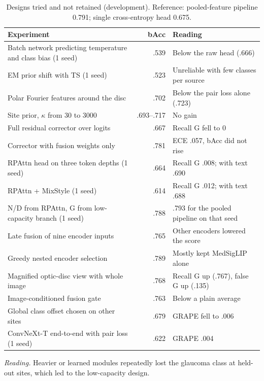 \documentclass[runningheads]{llncs}
\newcommand{\reading}[1]{\par\noindent\textit{Reading.} #1\par\medskip}
\begin{document}
\begin{table}[htbp]
\caption{Designs tried and not retained (development). Reference: pooled-feature pipeline 0.791; single cross-entropy head 0.675.}\label{tab:neg}\centering\scriptsize
\begin{tabular}{@{}p{}rp{}@{}}
\toprule
Experiment & bAcc & Reading\\
\midrule
Batch network predicting temperature and class bias (1 seed) & .539 & Below the raw head (.666)\\
EM prior shift with TS (1 seed) & .523 & Unreliable with few classes per source\\
Polar Fourier features around the disc & .702 & Below the pair loss alone (.723)\\
Site prior, $\kappa$ from 30 to 3000 & .693--.717 & No gain\\
Full residual corrector over logits & .667 & Recall G fell to 0\\
Corrector with fusion weights only & .781 & ECE .057, bAcc did not rise\\
RPAttn head on three token depths (1 seed) & .664 & Recall G .008; with text .690\\
RPAttn + MixStyle (1 seed) & .614 & Recall G .012; with text .688\\
N/D from RPAttn, G from low-capacity branch (1 seed) & .788 & .793 for the pooled pipeline on that seed\\
Late fusion of nine encoder inputs & .765 & Other encoders lowered the score\\
Greedy nested encoder selection & .789 & Mostly kept MedSigLIP alone\\
Magnified optic-disc view with whole image & .768 & Recall G up (.767), false G up (.135)\\
Image-conditioned fusion gate & .763 & Below a plain average\\
Global class offset chosen on other sites & .679 & GRAPE fell to .006\\
ConvNeXt-T end-to-end with pair loss (1 seed) & .622 & GRAPE .004\\
\bottomrule
\end{tabular}
\end{table}
\reading{Heavier or learned modules repeatedly lost the glaucoma class at held-out sites, which led to the low-capacity design.}
\end{document}

